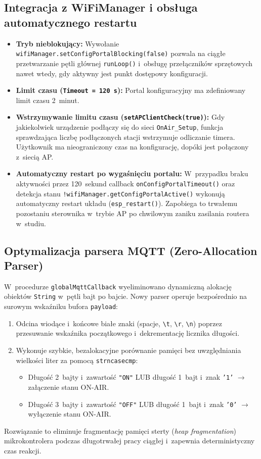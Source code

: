 \documentclass[11pt,a4paper]{article}
\begin{document}
\subsection{Integracja z WiFiManager i obsługa automatycznego restartu}
\begin{itemize}[leftmargin=1.5em]
    \item \textbf{Tryb nieblokujący:} Wywołanie \texttt{wifiManager.setConfigPortalBlocking(false)} pozwala na ciągłe przetwarzanie pętli głównej \texttt{runLoop()} i~obsługę przełączników sprzętowych nawet wtedy, gdy aktywny jest punkt dostępowy konfiguracji.
    \item \textbf{Limit czasu (\texttt{Timeout = 120 s}):} Portal konfiguracyjny ma zdefiniowany limit czasu 2~minut.
    \item \textbf{Wstrzymywanie limitu czasu (\texttt{setAPClientCheck(true)}):} Gdy jakiekolwiek urządzenie podłączy się do sieci \texttt{OnAir\_Setup}, funkcja sprawdzająca liczbę podłączonych stacji wstrzymuje odliczanie timera. Użytkownik ma nieograniczony czas na konfigurację, dopóki jest połączony z~siecią AP.
    \item \textbf{Automatyczny restart po wygaśnięciu portalu:} W~przypadku braku aktywności przez 120~sekund callback \texttt{onConfigPortalTimeout()} oraz detekcja stanu \texttt{!wifiManager.getConfigPortalActive()} wykonują automatyczny restart układu (\texttt{esp\_restart()}). Zapobiega to trwałemu pozostaniu sterownika w~trybie AP po chwilowym zaniku zasilania routera w~studiu.
\end{itemize}

\subsection{Optymalizacja parsera MQTT (Zero-Allocation Parser)}
W~procedurze \texttt{globalMqttCallback} wyeliminowano dynamiczną alokację obiektów \texttt{String} w~pętli bajt po bajcie. Nowy parser operuje bezpośrednio na surowym wskaźniku bufora \texttt{payload}:
\begin{enumerate}[leftmargin=1.5em]
    \item Odcina wiodące i~końcowe białe znaki (spacje, \texttt{\textbackslash t}, \texttt{\textbackslash r}, \texttt{\textbackslash n}) poprzez przesuwanie wskaźnika początkowego i~dekrementację licznika długości.
    \item Wykonuje szybkie, bezalokacyjne porównanie pamięci bez uwzględniania wielkości liter za pomocą \texttt{strncasecmp}:
    \begin{itemize}
        \item Długość 2~bajty i~zawartość \texttt{"ON"} LUB długość 1~bajt i~znak \texttt{'1'} $\rightarrow$ załączenie stanu ON-AIR.
        \item Długość 3~bajty i~zawartość \texttt{"OFF"} LUB długość 1~bajt i~znak \texttt{'0'} $\rightarrow$ wyłączenie stanu ON-AIR.
    \end{itemize}
\end{enumerate}
Rozwiązanie to eliminuje fragmentację pamięci sterty (\textit{heap fragmentation}) mikrokontrolera podczas długotrwałej pracy ciągłej i~zapewnia deterministyczny czas reakcji.
\end{document}
